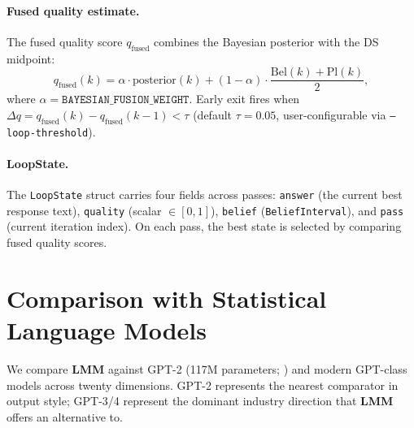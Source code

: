 \documentclass[11pt,a4paper]{article}
\newcommand{\lmm}{\texorpdfstring{%
  \textbf{\color{lmmAccent}LMM}}{LMM}}
\begin{document}
\paragraph{Fused quality estimate.}
The fused quality score $q_{\mathrm{fused}}$ combines the Bayesian posterior with the DS midpoint:
\begin{equation}
  q_{\mathrm{fused}}(k) =
    \alpha \cdot \mathrm{posterior}(k)
    + (1-\alpha) \cdot \frac{\mathrm{Bel}(k) + \mathrm{Pl}(k)}{2},
  \label{eq:fusion}
\end{equation}
where $\alpha = \texttt{BAYESIAN\_FUSION\_WEIGHT}$. Early exit fires when
$\Delta q = q_{\mathrm{fused}}(k) - q_{\mathrm{fused}}(k-1) < \tau$ (default $\tau = 0.05$,
user-configurable via \texttt{--loop-threshold}).

\paragraph{LoopState.}
The \texttt{LoopState} struct carries four fields across passes:
\texttt{answer} (the current best response text), \texttt{quality} (scalar $\in[0,1]$),
\texttt{belief} (\texttt{BeliefInterval}), and \texttt{pass} (current iteration index).
On each pass, the best state is selected by comparing fused quality scores.

\section{Comparison with Statistical Language Models}
\label{sec:compare}

We compare \lmm{} against GPT-2 (117M parameters; \citealt{radford2019language}) and modern
GPT-class models across twenty dimensions. GPT-2 represents the nearest comparator in
output style; GPT-3/4 represent the dominant industry direction that \lmm{} offers an
alternative to.
\end{document}
